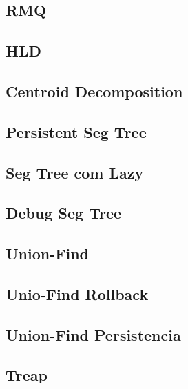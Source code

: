 \subsection{RMQ}
\raggedbottom
\hrulefill
\subsection{HLD}
\raggedbottom
\hrulefill
\subsection{Centroid Decomposition}
\raggedbottom
\hrulefill
\subsection{Persistent Seg Tree}
\raggedbottom
\hrulefill
\subsection{Seg Tree com Lazy}
\raggedbottom
\hrulefill
\subsection{Debug Seg Tree}
\raggedbottom
\hrulefill
\subsection{Union-Find}
\raggedbottom
\hrulefill
\subsection{Unio-Find Rollback}
\raggedbottom
\hrulefill
\subsection{Union-Find Persistencia}
\raggedbottom
\hrulefill
\subsection{Treap}
\raggedbottom
\hrulefill
